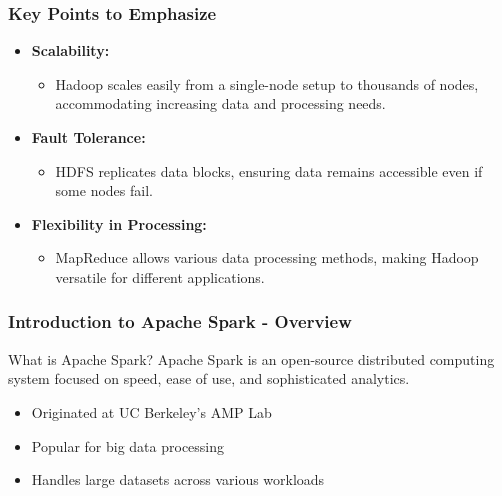 \documentclass[aspectratio=169]{beamer}
\begin{document}
\begin{frame}
    \frametitle{Key Points to Emphasize}
    \begin{itemize}
        \item \textbf{Scalability:} 
        \begin{itemize}
            \item Hadoop scales easily from a single-node setup to thousands of nodes, accommodating increasing data and processing needs.
        \end{itemize}
        \item \textbf{Fault Tolerance:}
        \begin{itemize}
            \item HDFS replicates data blocks, ensuring data remains accessible even if some nodes fail.
        \end{itemize}
        \item \textbf{Flexibility in Processing:}
        \begin{itemize}
            \item MapReduce allows various data processing methods, making Hadoop versatile for different applications.
        \end{itemize}
    \end{itemize}
\end{frame}

\begin{frame}[fragile]
    \frametitle{Introduction to Apache Spark - Overview}
    \begin{block}{What is Apache Spark?}
        Apache Spark is an open-source distributed computing system focused on speed, ease of use, and sophisticated analytics.
        \begin{itemize}
            \item Originated at UC Berkeley's AMP Lab
            \item Popular for big data processing
            \item Handles large datasets across various workloads
        \end{itemize}
    \end{block}
\end{frame}
\end{document}
